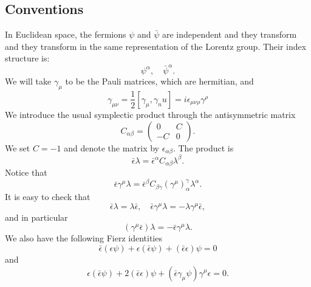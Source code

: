 \subsection{Conventions}
In Euclidean space, the fermions $\psi$ and $\bar{\psi}$ are independent and 
they transform and they transform in the same representation of the Lorentz
group. Their index structure is:
\begin{equation}
  \psi^\alpha, \quad\bar{\psi}^\alpha .
\end{equation}
We will take $\gamma_\mu$ to be the Pauli matrices, which are hermitian, and
\begin{equation}
  \gamma_{\mu\nu} = \frac{1}{2}\left[\gamma_\mu,\gamma_nu\right]
= i\epsilon_{\mu\nu\rho}\gamma^{\rho}
\end{equation}
We introduce the usual symplectic product through the antisymmetric matrix
\begin{equation}
  C_{\alpha\beta} = 
  \begin{pmatrix}
        0 & C\\
        -C & 0
  \end{pmatrix}.
\end{equation}
We set $C=-1$ and denote the matrix by $\epsilon_{\alpha\beta}$. The product
is
\begin{equation}
  \bar{\epsilon}\lambda = \bar{\epsilon}^\alpha
  C_{\alpha\beta}\lambda^\beta .
\end{equation}
Notice that
\begin{equation}
  \bar{\epsilon}\gamma^\mu\lambda = \bar{\epsilon}^\beta
  C_{\beta\gamma}(\gamma^\mu)^\gamma_\alpha\lambda^\alpha .
\end{equation}
It is easy to check that
\begin{equation}
\bar{\epsilon}\lambda = \lambda\bar{\epsilon},\quad
\bar{\epsilon}\gamma^\mu\lambda = -\lambda\gamma^\mu\bar{\epsilon},
\end{equation}
and in particular
\begin{equation}
  (\gamma^\mu\bar{\epsilon})\lambda = -\bar{\epsilon}\gamma^\mu\lambda .
\end{equation}
We also have the following Fierz identities
\begin{equation}
  \bar{\epsilon}(\epsilon\psi) + \epsilon(\bar{\epsilon}\psi)
  + (\bar{\epsilon}\epsilon)\psi = 0
\end{equation}
and
\begin{equation}
  \epsilon(\bar{\epsilon}\psi) + 2(\bar{\epsilon}\epsilon)\psi
  + (\bar{\epsilon}\gamma_\mu\psi)\gamma^\mu\epsilon = 0.
\end{equation}
